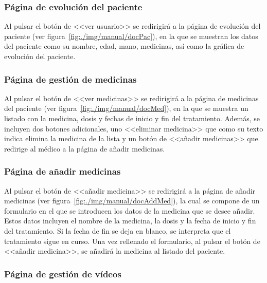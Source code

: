 
\subsubsection{Página de evolución del paciente}

Al pulsar el botón de <<ver usuario>> se redirigirá a la página de evolución del paciente (ver figura~\ref{fig:./img/manual/docPac}), en la que se muestran los datos del paciente como su nombre, edad, mano, medicinas, así como la gráfica de evolución del paciente.


\subsubsection{Página de gestión de medicinas}

Al pulsar el botón de <<ver medicinas>> se redirigirá a la página de medicinas del paciente (ver figura~\ref{fig:./img/manual/docMed}), en la que se muestra un listado con la medicina, dosis y fechas de inicio y fin del tratamiento. Además, se incluyen dos botones adicionales, uno <<eliminar medicina>> que como su texto indica elimina la medicina de la lista y un botón de <<añadir medicinas>> que redirige al médico a la página de añadir medicinas.



\subsubsection{Página de añadir medicinas}

Al pulsar el botón de <<añadir medicina>> se redirigirá a la página de añadir medicinas (ver figura~\ref{fig:./img/manual/docAddMed}), la cual se compone de un formulario en el que se introducen los datos de la medicina que se desee añadir. Estos datos incluyen el nombre de la medicina, la dosis y la fecha de inicio y fin del tratamiento. Si la fecha de fin se deja en blanco, se interpreta que el tratamiento sigue en curso. Una vez rellenado el formulario, al pulsar el botón de <<añadir medicina>>, se añadirá la medicina al listado del paciente.


\subsubsection{Página de gestión de vídeos}


